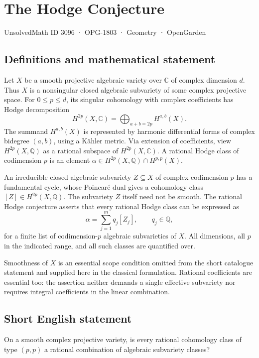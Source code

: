 \documentclass[11pt,a4paper]{article}
\begin{document}
\section*{The Hodge Conjecture}\label{3096}
{\small UnsolvedMath ID 3096 · OPG-1803 · Geometry · OpenGarden}
\subsection{Definitions and mathematical statement}
Let $X$ be a smooth projective algebraic variety over $\mathbb C$ of
complex dimension $d$. Thus $X$ is a nonsingular closed algebraic subvariety
of some complex projective space. For $0\le p\le d$, its singular
cohomology with complex coefficients has Hodge decomposition
\[
 H^{2p}(X,\mathbb C)=\bigoplus_{a+b=2p}H^{a,b}(X).
\]
The summand $H^{a,b}(X)$ is represented by harmonic differential forms
of complex bidegree $(a,b)$, using a Kähler metric.
Via extension of coefficients, view $H^{2p}(X,\mathbb Q)$ as a rational
subspace of $H^{2p}(X,\mathbb C)$. A rational Hodge class of codimension
$p$ is an element
$\alpha\in H^{2p}(X,\mathbb Q)\cap H^{p,p}(X)$.

An irreducible closed algebraic subvariety $Z\subseteq X$ of complex
codimension $p$ has a fundamental cycle, whose Poincaré dual gives a
cohomology class $[Z]\in H^{2p}(X,\mathbb Q)$. The subvariety $Z$ itself
need not be smooth.
The rational Hodge conjecture asserts that every rational Hodge class
can be expressed as
\[
 \alpha=\sum_{j=1}^m q_j[Z_j],\qquad q_j\in\mathbb Q,
\]
for a finite list of codimension-$p$ algebraic subvarieties of $X$.
All dimensions, all $p$ in the indicated range, and all such classes
are quantified over.

Smoothness of $X$ is an essential scope condition omitted from the short
catalogue statement and supplied here in the classical formulation.
Rational coefficients are essential too: the assertion neither demands
a single effective subvariety nor requires integral coefficients in the
linear combination.
\subsection{Short English statement}
On a smooth complex projective variety, is every rational cohomology class of type $(p,p)$ a rational combination of algebraic subvariety classes?
\end{document}
